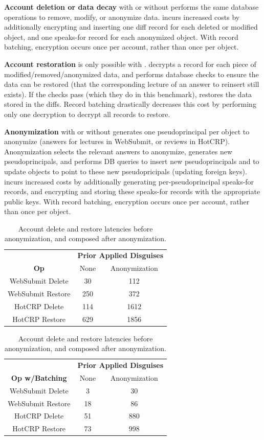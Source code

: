 \textbf{Account deletion or data decay} with or without \sys performs the same database operations
to remove, modify, or anonymize data. \sys incurs increased costs by additionally encrypting and
inserting one diff record for each deleted or modified object, and one speaks-for record for each
anonymized object.  With record batching, encryption occurs once per account, rather than once per
object.

\textbf{Account restoration} is only possible with \sys. \sys decrypts a record for each
piece of modified/removed/anonymized data, and performs database checks to ensure the data can be restored
(\eg that the corresponding lecture of an answer to reinsert still exists). If the checks pass
(which they do in this benchmark), \sys restores the data stored in the diffs.
Record batching drastically decreases this cost by performing only one decryption to decrypt all
records to restore.

\textbf{Anonymization} with or without \sys generates one pseudoprincipal per object to anonymize
(\eg answers for lectures in WebSubmit, or reviews in HotCRP). Anonymization selects the relevant answers
to anonymize, generates new pseudoprincipals, and performs DB queries to insert new pseudoprincipals
and to update objects to point to these new pseudopricipals (\eg updating foreign keys).
\sys incurs increased costs by additionally generating per-pseudoprincipal speaks-for records, and
encrypting and storing these speaks-for records with the appropriate public keys.
With record batching, encryption occurs once per account, rather than once per object.

\begin{table}[t!]
\begin{center}
\begin{tabular}{ c | c c }
& \multicolumn{2}{c}{\textbf{Prior Applied Disguises}} \\
    \textbf{Op} & None & Anonymization \\
\hline
WebSubmit Delete & 30 & 112 \\
WebSubmit Restore & 250 & 372\\
HotCRP Delete & 114 & 1612 \\
HotCRP Restore & 629 & 1856 \\
\end{tabular}
\quad
\begin{tabular}{ c | c c }
 & \multicolumn{2}{c}{\textbf{Prior Applied Disguises}} \\
    \textbf{Op w/Batching} & None & Anonymization \\
\hline
WebSubmit Delete  & 3 & 30 \\
WebSubmit Restore  & 18 & 86\\
HotCRP Delete  & 51 & 880 \\
HotCRP Restore  & 73 & 998
\end{tabular}
\end{center}
\caption{Account delete and restore latencies before anonymization, and composed after anonymization.}
\label{tab:composition}
\end{table}

